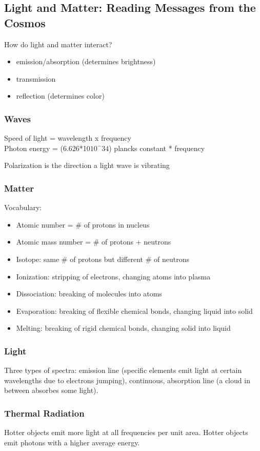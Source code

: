 \subsection{Light and Matter: Reading Messages from the Cosmos}
How do light and matter interact?
\begin{itemize}
\item emission/absorption (determines brightness)
\item transmission
\item reflection (determines color)
\end{itemize}

\subsubsection{Waves}
Speed of light = wavelength x frequency\\
Photon energy = (6.626*10$10^-34$) plancks constant * frequency

Polarization is the direction a light wave is vibrating

\subsubsection{Matter}
Vocabulary:
\begin{itemize}
\item Atomic number = \# of protons in nucleus
\item Atomic mass number = \# of protons + neutrons
\item Isotope: same \# of protons but different \# of neutrons
\item Ionization: stripping of electrons, changing atoms into plasma
\item Dissociation: breaking of molecules into atoms
\item Evaporation: breaking of flexible chemical bonds, changing liquid into solid
\item Melting: breaking of rigid chemical bonds, changing solid into liquid
\end{itemize}

\subsubsection{Light}
Three types of spectra: emission line (specific elements emit light at certain wavelengths due to electrons jumping), continuous, absorption line (a cloud in between absorbes some light).

\subsubsection{Thermal Radiation}
Hotter objects emit more light at all frequencies per unit area. Hotter objects emit photons with a higher average energy.

